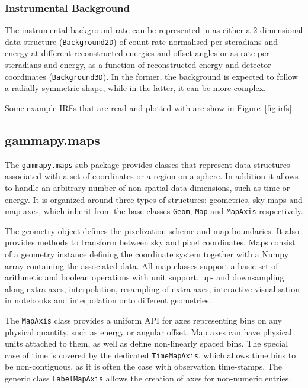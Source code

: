 \documentclass[traditabstract, longauth]{aa}
\newcommand{\code}[1]{\texttt{#1}}
\begin{document}
{\subsubsection{Instrumental Background}
The instrumental background rate can be represented in \gammapy as either a 2-dimensional
data structure (\code{Background2D}) of count rate normalised per steradians and energy at different
reconstructed energies and offset angles or as rate per steradians and energy, as a
function of reconstructed energy and detector coordinates (\code{Background3D}).
In the former, the background is expected to follow a radially symmetric shape,
while in the latter, it can be more complex.

Some example IRFs that are read and plotted with \gammapy are show in Figure~\ref{fig:irfs}.

\subsection{gammapy.maps}
\label{ssec:gammapy-maps}
The \code{gammapy.maps} sub-package provides classes that represent data
structures associated with a set of coordinates or a region on a sphere. In
addition it allows to handle an arbitrary number of non-spatial data
dimensions, such as time or energy. It is organized around three types of
structures: geometries, sky maps and map axes, which inherit from the base
classes \code{Geom}, \code{Map} and \code{MapAxis} respectively.

The geometry object defines the pixelization scheme and map boundaries. It also
provides methods to transform between sky and pixel coordinates. Maps consist
of a geometry instance defining the coordinate system together with a
Numpy array containing the associated data. All map classes support a basic
set of arithmetic and boolean operations with  unit support, up- and downsampling
along extra axes, interpolation, resampling of extra axes, interactive visualisation
in notebooks and interpolation onto different geometries.

The \code{MapAxis} class provides a uniform API for axes representing
bins on any physical quantity, such as energy or angular offset.
Map axes can have physical units attached to them, as well as define
non-linearly spaced bins. The special case of time is covered by the
dedicated \code{TimeMapAxis}, which allows time bins to be non-contiguous,
as it is often the case with observation time-stamps. The generic
class \code{LabelMapAxis} allows the creation of axes for non-numeric entries.

}
\end{document}
